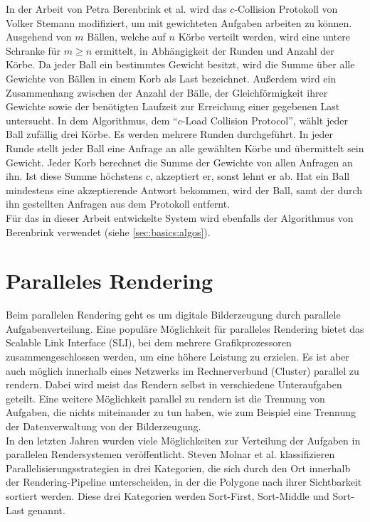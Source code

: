 In der Arbeit von Petra Berenbrink et al. \cite{ccol2} wird das $c$-Collision Protokoll von Volker Stemann \cite{ccol3} modifiziert, um mit gewichteten Aufgaben arbeiten zu können. Ausgehend von $m$ Bällen, welche auf $n$ Körbe verteilt werden, wird eine untere Schranke für $m \ge n$ ermittelt, in Abhängigkeit der Runden und Anzahl der Körbe. Da jeder Ball ein bestimmtes Gewicht besitzt, wird die Summe über alle Gewichte von Bällen in einem Korb als Last bezeichnet. Außerdem wird ein Zusammenhang zwischen der Anzahl der Bälle, der Gleichförmigkeit ihrer Gewichte sowie der benötigten Laufzeit zur Erreichung einer gegebenen Last untersucht. In dem Algorithmus, dem "`$c$-Load Collision Protocol"', wählt jeder Ball zufällig drei Körbe. Es werden mehrere Runden durchgeführt. In jeder Runde stellt jeder Ball eine Anfrage an alle gewählten Körbe und übermittelt sein Gewicht. Jeder Korb berechnet die Summe der Gewichte von allen Anfragen an ihn. Ist diese Summe höchstens $c$, akzeptiert er, sonst lehnt er ab. Hat ein Ball mindestens eine akzeptierende Antwort bekommen, wird der Ball, samt der durch ihn gestellten Anfragen aus dem Protokoll entfernt.\\
Für das in dieser Arbeit entwickelte System wird ebenfalls der Algorithmus von Berenbrink verwendet (siehe \ref{sec:basics:algos}).
\section{Paralleles Rendering}
\label{sec:relwork:parrender}
Beim parallelen Rendering geht es um digitale Bilderzeugung durch parallele Aufgabenverteilung. Eine populäre Möglichkeit für paralleles Rendering bietet das Scalable Link Interface (SLI), bei dem mehrere Grafikprozessoren zusammengeschlossen werden, um eine höhere Leistung zu erzielen. Es ist aber auch möglich innerhalb eines Netzwerks im Rechnerverbund (Cluster) parallel zu rendern. Dabei wird meist das Rendern selbst in verschiedene Unteraufgaben geteilt. Eine weitere Möglichkeit parallel zu rendern ist die Trennung von Aufgaben, die nichts miteinander zu tun haben, wie zum Beispiel eine Trennung der Datenverwaltung von der Bilderzeugung.\\
In den letzten Jahren wurden viele Möglichkeiten zur Verteilung der Aufgaben in parallelen Rendersystemen veröffentlicht. Steven Molnar et al. \cite{molnar} klassifizieren Parallelisierungsstrategien in drei Kategorien, die sich durch den Ort innerhalb der Rendering-Pipeline unterscheiden, in der die Polygone nach ihrer Sichtbarkeit sortiert werden. Diese drei Kategorien werden Sort-First, Sort-Middle und Sort-Last genannt.


